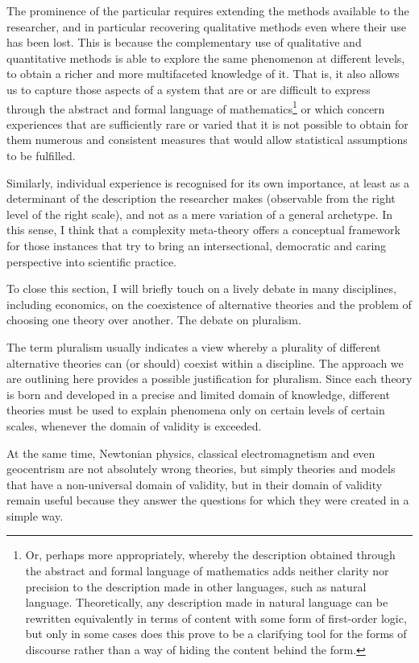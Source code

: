 \documentclass[a4paper, headings=standardclasses]{scrartcl}
\begin{document}
The prominence of the particular requires extending the methods available to the researcher, and in particular recovering qualitative methods even where their use has been lost. This is because the complementary use of qualitative and quantitative methods is able to explore the same phenomenon at different levels, to obtain a richer and more multifaceted knowledge of it. That is, it also allows us to capture those aspects of a system that are or are difficult to express through the abstract and formal language of mathematics\footnote{Or, perhaps more appropriately, whereby the description obtained through the abstract and formal language of mathematics adds neither clarity nor precision to the description made in other languages, such as natural language. Theoretically, any description made in natural language can be rewritten equivalently in terms of content with some form of first-order logic, but only in some cases does this prove to be a clarifying tool for the forms of discourse rather than a way of hiding the content behind the form.} or which concern experiences that are sufficiently rare or varied that it is not possible to obtain for them numerous and consistent measures that would allow statistical assumptions to be fulfilled.

Similarly, individual experience is recognised for its own importance, at least as a determinant of the description the researcher makes (observable from the right level of the right scale), and not as a mere variation of a general archetype.
In this sense, I think that a complexity meta-theory offers a conceptual framework for those instances that try to bring an intersectional, democratic and caring perspective into scientific practice.

To close this section, I will briefly touch on a lively debate in many disciplines, including economics, on the coexistence of alternative theories and the problem of choosing one theory over another. The debate on pluralism.

The term pluralism usually indicates a view whereby a plurality of different alternative theories can (or should) coexist within a discipline.
The approach we are outlining here provides a possible justification for pluralism.
Since each theory is born and developed in a precise and limited domain of knowledge, different theories must be used to explain phenomena only on certain levels of certain scales, whenever the domain of validity is exceeded.

At the same time, Newtonian physics, classical electromagnetism and even geocentrism are not absolutely wrong theories, but simply theories and models that have a non-universal domain of validity, but in their domain of validity remain useful because they answer the questions for which they were created in a simple way.
\end{document}
